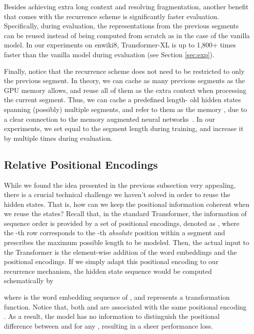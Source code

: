 \documentclass[11pt,a4paper]{article}
\begin{document}
Besides achieving extra long context and resolving fragmentation, another benefit that comes with the recurrence scheme is significantly faster evaluation.
Specifically, during evaluation, the representations from the previous segments can be reused instead of being computed from scratch as in the case of the vanilla model.
In our experiments on enwiki8, Transformer-XL is up to 1,800+ times faster than the vanilla model during evaluation (see Section \ref{sec:exp}).



Finally, notice that the recurrence scheme does not need to be restricted to only the previous segment.
In theory, we can cache as many previous segments as the GPU memory allows, and reuse all of them as the extra context when processing the current segment.
Thus, we can cache a predefined length- old hidden states spanning (possibly) multiple segments, and refer to them as the memory , due to a clear connection to the memory augmented neural networks~\citep{graves2014neural,weston2014memory}.
In our experiments, we set  equal to the segment length during training, and increase it by multiple times during evaluation.


\subsection{Relative Positional Encodings}
\label{sec:rel-pos-embed}
While we found the idea presented in the previous subsection very appealing, there is a crucial technical challenge we haven't solved in order to reuse the hidden states.
That is, how can we keep the positional information coherent when we reuse the states?
Recall that, in the standard Transformer, the information of sequence order is provided by a set of positional encodings, denoted as , where the -th row  corresponds to the -th \textit{absolute} position within a segment and  prescribes the maximum possible length to be modeled.
Then, the actual input to the Transformer is the element-wise addition of the word embeddings and the positional encodings.
If we simply adapt this positional encoding to our recurrence mechanism, the hidden state sequence would be computed schematically by
\par\nobreak
\vspace{-0.5em}
\small

\normalsize
\vspace{-1.5em}


\noindent where  is the word embedding sequence of , and  represents a transformation function.
Notice that, both  and  are associated with the same positional encoding .
As a result, the model has no information to distinguish the positional difference between  and  for any , resulting in a sheer performance loss.
\end{document}
